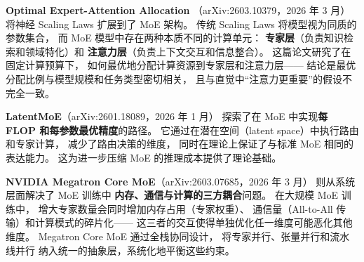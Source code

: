 \textbf{Optimal Expert-Attention Allocation}%
（arXiv:2603.10379，2026 年 3 月）
将神经 Scaling Laws 扩展到了 MoE 架构。
传统 Scaling Laws 将模型视为同质的参数集合，
而 MoE 模型中存在两种本质不同的计算单元：
\textbf{专家层}（负责知识检索和领域特化）和
\textbf{注意力层}（负责上下文交互和信息整合）。
这篇论文研究了在固定计算预算下，
如何最优地分配计算资源到专家层和注意力层——
结论是最优分配比例与模型规模和任务类型密切相关，
且与直觉中``注意力更重要''的假设不完全一致。

\textbf{LatentMoE}（arXiv:2601.18089，2026 年 1 月）%
探索了在 MoE 中实现\textbf{每 FLOP 和每参数最优精度}的路径。
它通过在潜在空间（latent space）中执行路由和专家计算，
减少了路由决策的维度，
同时在理论上保证了与标准 MoE 相同的表达能力。
这为进一步压缩 MoE 的推理成本提供了理论基础。

\textbf{NVIDIA Megatron Core MoE}（arXiv:2603.07685，2026 年 3 月）%
则从系统层面解决了 MoE 训练中
\textbf{内存、通信与计算的三方耦合}问题。
在大规模 MoE 训练中，
增大专家数量会同时增加内存占用（专家权重）、
通信量（All-to-All 传输）和计算模式的碎片化——
这三者的交互使得单独优化任一维度可能恶化其他维度。
Megatron Core MoE 通过全栈协同设计，
将专家并行、张量并行和流水线并行
纳入统一的抽象层，系统化地平衡这些约束。


